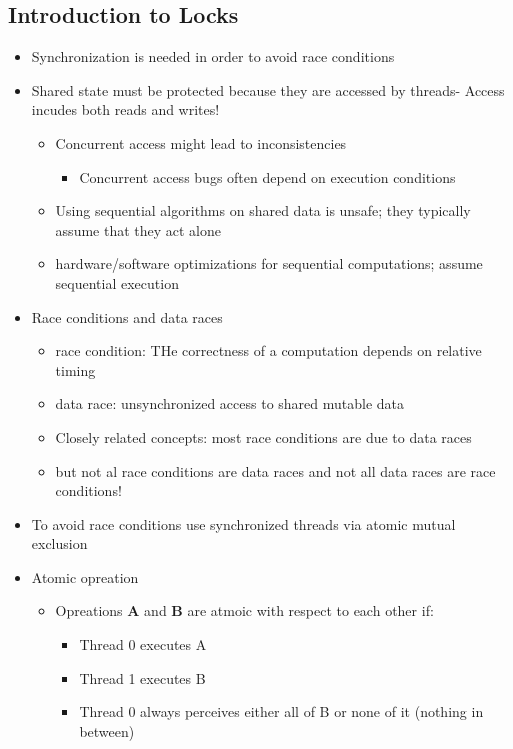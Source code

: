 \documentclass[a4paper]{article}
\begin{document}
	\subsection*{Introduction to Locks}
	\begin{itemize}
		\item Synchronization is needed in order to avoid race conditions
		\item Shared state must be protected because they are accessed by threads- Access incudes both reads and writes!
			\begin{itemize}
				\item Concurrent access might lead to inconsistencies
					\begin{itemize}
						\item Concurrent access bugs often depend on execution conditions
					\end{itemize}
				\item Using sequential algorithms on shared data is unsafe; they typically assume that they act alone
				\item hardware/software optimizations for sequential computations; assume sequential execution
			\end{itemize}
		\item Race conditions and data races
			\begin{itemize}
				\item race condition: THe correctness of a computation depends on relative timing
				\item data race: unsynchronized access to shared mutable data
				\item Closely related concepts: most race conditions are due to data races
				\item but not al race conditions are data races and not all data races are race conditions!
			\end{itemize}
		\item To avoid race conditions use synchronized threads via atomic mutual exclusion
		\item Atomic opreation
			\begin{itemize}
				\item Opreations \textbf{A} and \textbf{B} are atmoic with respect to each other if:
					\begin{itemize}
						\item Thread 0 executes A
						\item Thread 1 executes B
						\item Thread 0 always perceives either all of B or none of it (nothing in between)

\end{itemize}
\end{itemize}
\end{itemize}
\end{document}
